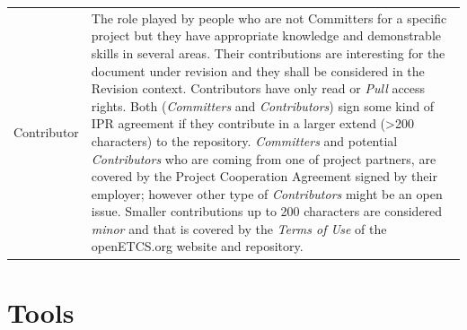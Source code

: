 \documentclass{template/openetcs_article}
\begin{document}
\begin{supertabular}{|m{3cm}m{11cm}|}
\\\hline
Contributor &
The role played by people who are not Committers for a specific project but they have appropriate knowledge and demonstrable skills in several areas. Their contributions are interesting for the document under revision and they shall be considered in the Revision context. Contributors have only read or {\it Pull} access rights. Both ({\it Committers} and {\it Contributors}) sign some kind of IPR agreement if they contribute in a larger extend (>200 characters) to the repository. {\it Committers} and potential {\it Contributors} who are coming from one of project partners, are covered by the Project Cooperation Agreement signed by their employer; however other type of {\it Contributors} might be an open issue. Smaller contributions up to 200 characters are considered {\it minor} and that is covered by the {\it Terms of Use} of the openETCS.org website and repository.
   
\end{supertabular}

\section{Tools}
\end{document}
